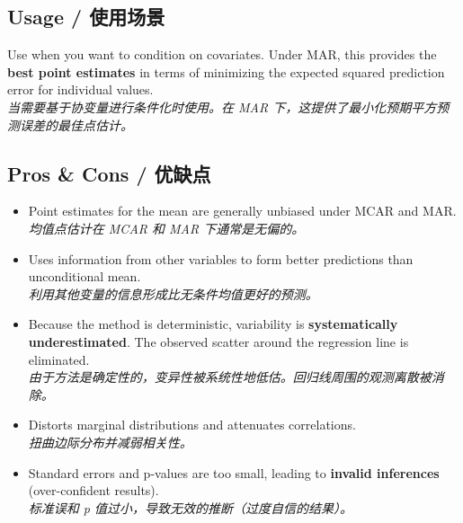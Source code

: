 \documentclass[9pt, a4paper]{article}
\begin{document}
\subsection{Usage / 使用场景}
Use when you want to condition on covariates. Under MAR, this provides the \textbf{best point estimates} in terms of minimizing the expected squared prediction error for individual values.\\
\textit{当需要基于协变量进行条件化时使用。在 MAR 下，这提供了最小化预期平方预测误差的最佳点估计。}

\subsection{Pros \& Cons / 优缺点}
\begin{tcolorbox}[prosbox]
    \begin{itemize}
        \item [\ding{51}] Point estimates for the mean are generally unbiased under MCAR and MAR.\\
        \textit{均值点估计在 MCAR 和 MAR 下通常是无偏的。}
        \item [\ding{51}] Uses information from other variables to form better predictions than unconditional mean.\\
        \textit{利用其他变量的信息形成比无条件均值更好的预测。}
    \end{itemize}
\end{tcolorbox}
\begin{tcolorbox}[consbox]
    \begin{itemize}
        \item [\ding{55}] Because the method is deterministic, variability is \textbf{systematically underestimated}. The observed scatter around the regression line is eliminated.\\
        \textit{由于方法是确定性的，变异性被系统性地低估。回归线周围的观测离散被消除。}
        \item [\ding{55}] Distorts marginal distributions and attenuates correlations.\\
        \textit{扭曲边际分布并减弱相关性。}
        \item [\ding{55}] Standard errors and p-values are too small, leading to \textbf{invalid inferences} (over-confident results).\\
        \textit{标准误和 p 值过小，导致无效的推断（过度自信的结果）。}
    \end{itemize}
\end{tcolorbox}
\end{document}
